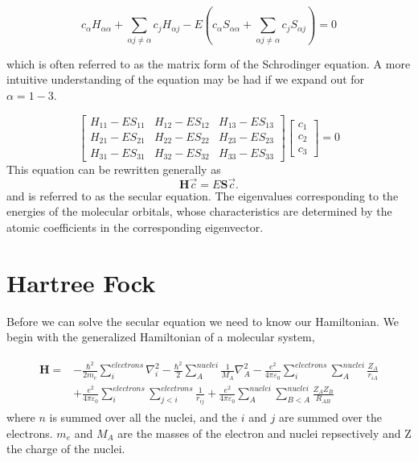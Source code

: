 \begin{equation}
  c_{\alpha} H_{\alpha \alpha} + \sum_{\alpha j \neq \alpha} c_j H_{\alpha j} -
  E \left( c_{\alpha} S_{\alpha \alpha} + \sum_{\alpha j \neq \alpha} c_j S_{\alpha j} \right) = 0
\end{equation}

which is often referred to as the matrix form of the Schrodinger
equation.  A more intuitive understanding of the equation may be had
if we expand out for $\alpha=1-3$.

\begin{equation} \label{eq:SchrodingerMatrix}
  \begin{bmatrix}
    H_{11}-ES_{11} & H_{12}-ES_{12} & H_{13}-ES_{13} \\
    H_{21}-ES_{21} & H_{22}-ES_{22} & H_{23}-ES_{23} \\
    H_{31}-ES_{31} & H_{32}-ES_{32} & H_{33}-ES_{33}
  \end{bmatrix}
  \begin{bmatrix}
    c_1 \\
    c_2 \\
    c_3
  \end{bmatrix} = 0
\end{equation}
This equation can be rewritten generally as
\begin{equation}
  \mathbf{H}\vec{c} = E \mathbf{S} \vec{c}.
\end{equation}
and is referred to as the secular equation.
The eigenvalues corresponding to the energies of the molecular orbitals,
whose characteristics are determined by the atomic coefficients in the
corresponding eigenvector.\cite{engel2012quantum}

\section{Hartree Fock}
        Before we can solve the secular equation we need to know our
        Hamiltonian.  We begin with the generalized Hamiltonian of a
        molecular system,\cite{engel2012quantum}

        \begin{align} \label{eq:fullhamiltonian}
          \begin{split}
            \mathbf{H} =& -\frac{\hbar^2}{2m_e}\sum_i^{electrons}\nabla_i^2-\frac{\hbar^2}{2}\sum_{A}^{nuclei}\frac{1}{M_{A}}\nabla_{A}^2 - \frac{e^2}{4\pi\varepsilon_0} \sum_i^{electrons}\sum_A^{nuclei}\frac{Z_A}{r_{iA}} \\
            & + \frac{e^2}{4\pi\varepsilon_0}\sum_{i}^{electrons}\sum_{j<i}^{electrons}\frac{1}{r_{ij}} + \frac{e^2}{4\pi\varepsilon_0}\sum_{A}^{nuclei}\sum_{B<A}^{nuclei}\frac{Z_AZ_B}{R_{AB}}
          \end{split}
        \end{align}
        where $n$ is summed over all the nuclei, and the $i$ and $j$ are summed over the electrons. 
        \(m_e\) and \(M_A\) are the masses of the electron and nuclei repsectively and Z the charge of the nuclei.

